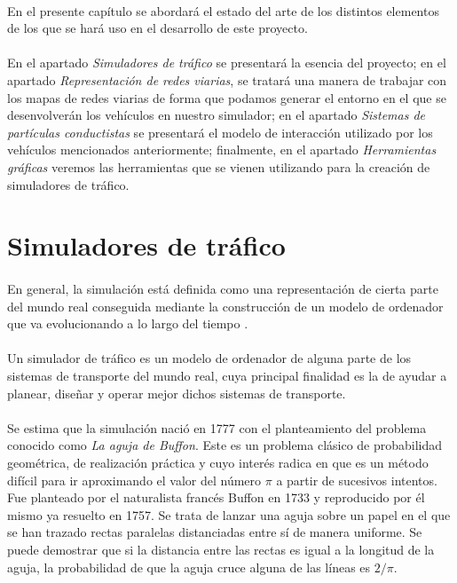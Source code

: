 	\paragraph{}
	En el presente capítulo se abordará el estado del arte de los distintos elementos de los que se hará uso en el desarrollo de este proyecto.
	
	\paragraph{}
	En el apartado \emph{Simuladores de tráfico} se presentará la esencia del proyecto; en el apartado \emph{Representación de redes viarias}, se tratará una manera de trabajar con los mapas de redes viarias de forma que podamos generar el entorno en el que se desenvolverán los vehículos en nuestro simulador; en el apartado \emph{Sistemas de partículas conductistas} se presentará el modelo de interacción utilizado por los vehículos mencionados anteriormente; finalmente, en el apartado \emph{Herramientas gráficas} veremos las herramientas que se vienen utilizando para la creación de simuladores de tráfico.

\section{Simuladores de tráfico}


	\paragraph{}
	En general, la simulación está definida como una representación de cierta parte del mundo real conseguida mediante la construcción de un modelo de ordenador que va evolucionando a lo largo del tiempo \cite{Drew1968}.
	
	\paragraph{}
	Un simulador de tráfico es un modelo de ordenador de alguna parte de los sistemas de transporte del mundo real, cuya principal finalidad es la de ayudar a planear, diseñar y operar mejor dichos sistemas de transporte.
	

	\paragraph{}
	Se estima que la simulación nació en 1777 con el planteamiento del problema conocido como \emph{La aguja de Buffon}. Este es un problema clásico de probabilidad geométrica, de realización práctica y cuyo interés radica en que es un método difícil para ir aproximando el valor del número $\pi$ a partir de sucesivos intentos. Fue planteado por el naturalista francés Buffon en 1733 y reproducido por él mismo ya resuelto en 1757. Se trata de lanzar una aguja sobre un papel en el que se han trazado rectas paralelas distanciadas entre sí de manera uniforme. Se puede demostrar que si la distancia entre las rectas es igual a la longitud de la aguja, la probabilidad de que la aguja cruce alguna de las líneas es $2/\pi$.
	
